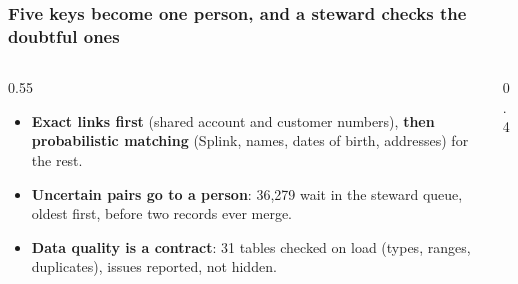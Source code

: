 \documentclass[aspectratio=169,10pt]{beamer}
\begin{document}
\begin{frame}
  \frametitle{Five keys become one person, and a steward checks the doubtful ones}
  \begin{columns}[T]
    \begin{column}{0.55\textwidth}
      \begin{itemize}\setlength\itemsep{0.45em}
        \item \textbf{Exact links first} (shared account and customer numbers), \textbf{then probabilistic matching} (Splink,
          names, dates of birth, addresses) for the rest.
        \item \textbf{Uncertain pairs go to a person}: 36,279 wait in the steward queue, oldest first, before two
          records ever merge.
        \item \textbf{Data quality is a contract}: 31 tables checked on load (types, ranges, duplicates), issues reported, not hidden.
      \end{itemize}
    \end{column}
    \begin{column}{0.4\textwidth}
    \end{column}
  \end{columns}
\end{frame}
\end{document}
